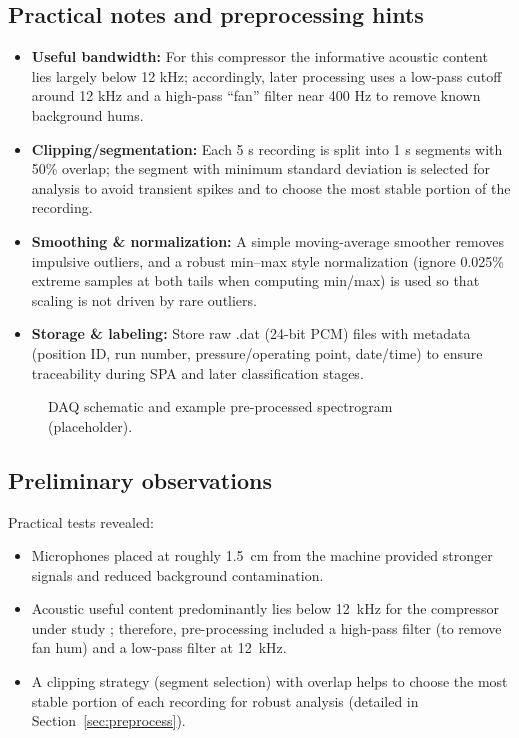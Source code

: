 \documentclass[12pt,a4paper]{article}
\begin{document}
\subsection{Practical notes and preprocessing hints}
\begin{itemize}
  \item \textbf{Useful bandwidth:} For this compressor the informative acoustic content lies largely below 12 kHz; accordingly, later processing uses a low-pass cutoff around 12 kHz and a high-pass ``fan'' filter near 400 Hz to remove known background hums.
  \item \textbf{Clipping/segmentation:} Each 5 s recording is split into 1 s segments with 50\% overlap; the segment with minimum standard deviation is selected for analysis to avoid transient spikes and to choose the most stable portion of the recording.
  \item \textbf{Smoothing \& normalization:} A simple moving-average smoother removes impulsive outliers, and a robust min–max style normalization (ignore 0.025\% extreme samples at both tails when computing min/max) is used so that scaling is not driven by rare outliers.
  \item \textbf{Storage \& labeling:} Store raw .dat (24-bit PCM) files with metadata (position ID, run number, pressure/operating point, date/time) to ensure traceability during SPA and later classification stages.
\end{itemize}

\begin{figure}[ht]
  \centering
  \caption{DAQ schematic and example pre-processed spectrogram (placeholder).}
  \label{fig:daq_placeholder}
\end{figure}

\subsection{Preliminary observations}
Practical tests revealed:
\begin{itemize}
    \item Microphones placed at roughly \SI{1.5}{cm} from the machine provided stronger signals and reduced background contamination.
    \item Acoustic useful content predominantly lies below \SI{12}{kHz} for the compressor under study \cite{Verma2016}; therefore, pre-processing included a high-pass filter (to remove fan hum) and a low-pass filter at \SI{12}{kHz}.
    \item A clipping strategy (segment selection) with overlap helps to choose the most stable portion of each recording for robust analysis (detailed in Section~\ref{sec:preprocess}).
\end{itemize}
\end{document}
